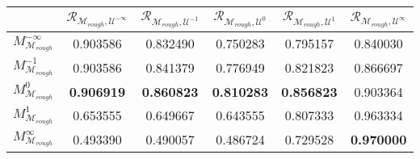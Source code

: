 \begin{tabular}{|l|c|c|c|c|c|}
\toprule
\hline
 & $\mathcal{R}_{\mathcal{M}_{rough}, \mathcal{U}^{-\infty}}$ & $\mathcal{R}_{\mathcal{M}_{rough}, \mathcal{U}^{-1}}$ & $\mathcal{R}_{\mathcal{M}_{rough}, \mathcal{U}^{0}}$ & $\mathcal{R}_{\mathcal{M}_{rough}, \mathcal{U}^{1}}$ & $\mathcal{R}_{\mathcal{M}_{rough}, \mathcal{U}^{\infty}}$ \\
\hline
\midrule
$M^{-\infty}_{\mathcal{M}_{rough}}$ & 0.903586 & 0.832490 & 0.750283 & 0.795157 & 0.840030 \\
$M^{-1}_{\mathcal{M}_{rough}}$ & 0.903586 & 0.841379 & 0.776949 & 0.821823 & 0.866697 \\
$M^{0}_{\mathcal{M}_{rough}}$ & \textbf{0.906919} & \textbf{0.860823} & \textbf{0.810283} & \textbf{0.856823} & 0.903364 \\
$M^{1}_{\mathcal{M}_{rough}}$ & 0.653555 & 0.649667 & 0.643555 & 0.807333 & 0.963334 \\
$M^{\infty}_{\mathcal{M}_{rough}}$ & 0.493390 & 0.490057 & 0.486724 & 0.729528 & \textbf{0.970000} \\
\hline
\bottomrule
\end{tabular}
